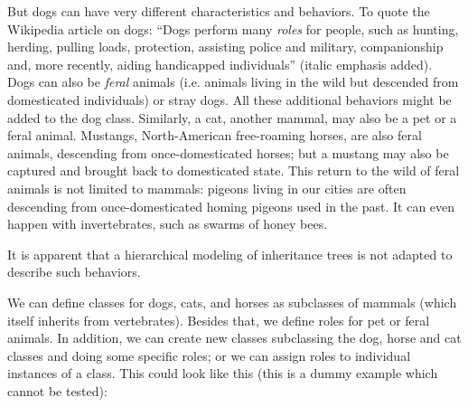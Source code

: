 But dogs can have very different characteristics and behaviors.
To quote the Wikipedia article on dogs: ``Dogs perform many 
\emph{roles} for people, such as hunting, herding, pulling 
loads, protection, assisting police and military, companionship 
and, more recently, aiding handicapped individuals'' (italic emphasis 
added). Dogs can also be \emph{feral} animals 
(i.e. animals living in the wild but 
descended from domesticated individuals) or stray dogs. All 
these additional behaviors might be added to the dog class. 
Similarly, a cat, another mammal, may also be a pet 
or a feral animal. Mustangs, North-American free-roaming horses, 
are also feral animals, descending from once-domesticated horses; 
but a mustang may also be captured and brought back to 
domesticated state. This return to the wild of feral animals 
is not limited to mammals: pigeons living in our cities are 
often descending from once-domesticated homing pigeons used 
in the past. It can even happen with invertebrates, such 
as swarms of honey bees.

It is apparent that a hierarchical modeling of inheritance 
trees is not adapted to describe such behaviors. 

  
We can define classes for dogs, cats, and horses as subclasses 
of mammals (which itself inherits from vertebrates). Besides 
that, we define roles for pet or feral animals. In addition, 
we can create new classes subclassing the dog, horse and cat 
classes and doing some specific roles; or we can assign roles 
to individual instances of a class. This could look like this 
(this is a dummy example which cannot be tested):


